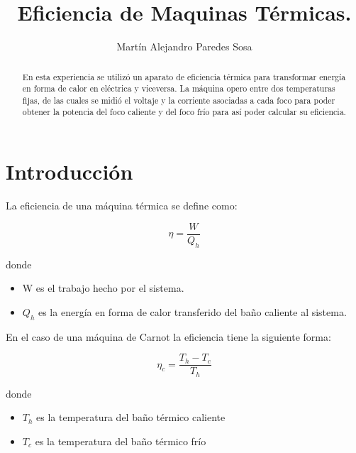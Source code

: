 \documentclass[12pt]{article}
\title{Eficiencia de Maquinas Térmicas.}
\author{Martín Alejandro Paredes Sosa}
\makeatletter
\let\thetitle\@title
\let\theauthor\@author
\makeatother
\begin{document}
\begin{center}
{ \large \bfseries \thetitle}
\end{center}
	\begin{minipage}{\textwidth}
		\begin{center} 
			\theauthor 
			\end{center}
	\end{minipage}
\begin{abstract}
En esta experiencia se utilizó un aparato de eficiencia térmica para transformar energía en forma de calor en eléctrica y viceversa. La máquina opero entre dos temperaturas fijas, de las cuales se midió el voltaje y la corriente asociadas a cada foco para poder obtener la potencia del foco caliente y del foco frío para así poder calcular su eficiencia.
\end{abstract}
\vspace{-1cm}
\section{Introducción}
\vspace{-0.5cm}
La eficiencia de una máquina térmica se define como:

\begin{equation}
\eta = \frac{W}{Q_h}
\end{equation}

donde
\begin{itemize}
 \item W es el trabajo hecho por el sistema.
\item $Q_h$ es la energía en forma de calor transferido del baño caliente al sistema.
\end{itemize}

En el caso de una máquina de Carnot la eficiencia tiene la siguiente forma:

\begin{equation}
\eta_c = \frac{T_h - T_c}{T_h}
\end{equation}

donde 
\begin{itemize}
\item $T_h$ es la temperatura del baño térmico caliente
\item $T_c$ es la temperatura del baño térmico frío
\end{itemize}
\end{document}
